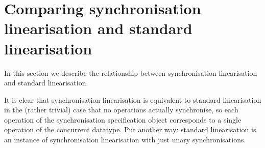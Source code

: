 \section{Comparing synchronisation linearisation and standard linearisation}
\label{sec:relating}

In this section we describe the relationship between synchronisation
linearisation and standard linearisation.

It is clear that synchronisation linearisation is equivalent to standard
linearisation in the (rather trivial) case that no operations actually
synchronise, so each operation of the synchronisation specification object
corresponds to a single operation of the concurrent datatype.  Put another
way: standard linearisation is an instance of synchronisation linearisation
with just unary synchronisations.

